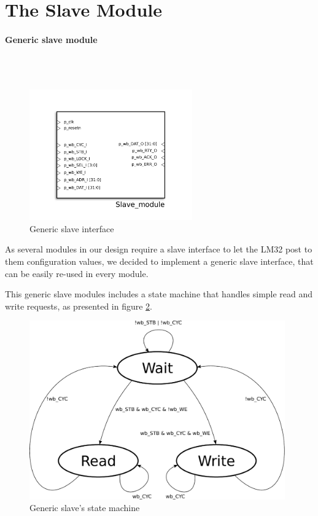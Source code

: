 
\section{The Slave Module}

\paragraph{Generic slave module}
~\\~
\begin{figure}[H]
\center
\includegraphics[width=7cm]{figs/slave_symbol.pdf}
\caption{Generic slave interface}
\label{generic_slave_interface}
\end{figure}

As several modules in our design require a slave interface to let the LM32 post to them configuration values, we decided to implement a generic slave interface, that can be easily re-used in every module.

This generic slave modules includes a state machine that handles simple read and write requests, as presented in figure \ref{state_machine_slave}.

\begin{figure}[h]
\center
\includegraphics[width=11cm]{figs/slave_state_machine.pdf}
\caption{Generic slave's state machine}
\label{state_machine_slave}
\end{figure}

